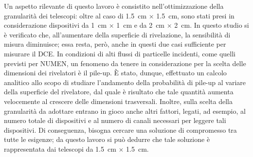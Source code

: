 Un aspetto rilevante di questo lavoro è consistito nell'ottimizzazione della granularità dei telescopi: oltre al caso di 1.5~cm $\times$ 1.5~cm, sono stati presi in considerazione dispositivi da 1~cm $\times$ 1~cm e da 2~cm $\times$ 2~cm.
In questo studio si è verificato che, all'aumentare della superficie di rivelazione, la sensibilità di misura diminuisce; essa resta, però, anche in questi due casi sufficiente per misurare il DCE.
In condizioni di alti flussi di particelle incidenti, come quelli previsti per NUMEN, un fenomeno da tenere in considerazione per la scelta delle dimensioni dei rivelatori è il pile-up.
È stato, dunque, effettuato un calcolo analitico allo scopo di studiare l'andamento della probabilità di pile-up al variare della superficie del rivelatore, dal quale è risultato che tale quantità aumenta velocemente al crescere delle dimensioni trasversali.
Inoltre, sulla scelta della granularità da adottare entrano in gioco anche altri fattori, legati, ad esempio, al numero totale di dispositivi e al numero di canali necessari per leggere tali dispositivi.
Di conseguenza, bisogna cercare una soluzione di compromesso tra tutte le esigenze; da questo lavoro si può dedurre che tale soluzione è rappresentata dai telescopi da 1.5~cm $\times$ 1.5~cm.






